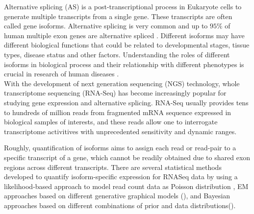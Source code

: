 \documentclass[11pt]{article}
\begin{document}
\noindent Alternative splicing (AS) is a post-transcriptional process in Eukaryote cells to generate multiple transcripts from a single gene. These transcripts are often called gene isoforms. Alternative splicing is very common and up to  $95\%$  of human multiple exon genes are alternative spliced \cite{pan2008deep}. Different isoforms may have different biological functions that could be related to developmental stages, tissue types, disease status and other factors. Understanding the roles of different isoforms in biological process and their relationship with different phenotypes is crucial in research of human diseases \cite{matlin2005understanding, he2009global}.  \\

\noindent With the development of next generation sequencing (NGS) technology, whole transcriptome sequencing (RNA-Seq) has become increasingly popular for studying gene expression and alternative splicing. RNA-Seq usually provides tens to hundreds of million reads from fragmented mRNA sequence expressed in biological samples of interests, and these reads allow one to interrogate transcriptome activitives with unprecedented sensitivity and dynamic ranges.   

\noindent Roughly, quantification of isoforms aims to assign each read or read-pair to a specific transcript of a gene, which cannot be readily obtained due to shared exon regions across different transcripts. There are several statistical methods developed to quantify isoform-specific expression for RNASeq data by using a likelihood-based approach to model read count data as Poisson distribution \cite{jiang2009statistical}, EM approaches based on different generative graphical models (\cite{roberts2013streaming, li2011rsem}), and Bayesian approaches based on different combinations of prior and data distributions(\cite{glausbitseq}).\\
\end{document}
